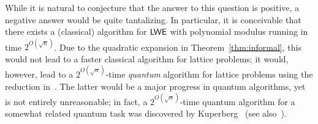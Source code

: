 While it is natural to conjecture that the answer to this question is positive,
a negative answer would be quite tantalizing. In particular, it is
conceivable that there exists a (classical) algorithm for $\mathsf{LWE}$ with polynomial modulus running in time
$2^{O(\sqrt{n})}$. Due to the quadratic expansion in Theorem~\ref{thm:informal}, this
would not lead to a faster classical algorithm for lattice problems; it would,
however, lead to a $2^{O(\sqrt{n})}$-time \emph{quantum} algorithm for
lattice problems using the reduction in~\cite{DBLP:journals/jacm/Regev09}.
The latter would be a major progress in quantum algorithms, yet is not
entirely unreasonable; in fact, a $2^{O(\sqrt{n})}$-time quantum algorithm
for a somewhat related quantum task was discovered by
Kuperberg~\cite{DBLP:journals/siamcomp/Kuperberg05} (see also~\cite{DBLP:journals/siamcomp/Regev04}).




